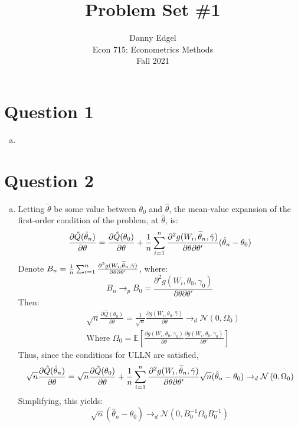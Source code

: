 \documentclass{article}
\newcommand{\N}{\mathcal{N}}
\newcommand{\est}[1]{\frac{1}{\lowercase{#1}}\sum_{i=1}^{\lowercase{#1}}}
\renewcommand{\tilde}[1]{\widetilde{#1}}
\newcommand{\that}{\hat{\theta}_n}
\newcommand{\ttilde}{\tilde{\theta}_n}
\newcommand{\ghat}{\hat{\gamma}}
\newcommand{\E}[1]{\mathbb{E}\left[#1\right]}%
\begin{document}
\title{	Problem Set \#1 }
\author{ 	Danny Edgel 					\\ 
			Econ 715: Econometrics Methods	\\
			Fall 2021						
		}
\maketitle\thispagestyle{empty}

\section*{Question 1}

\begin{enumerate}[(a)]
    \item 
\end{enumerate}

\section*{Question 2}

\begin{enumerate}[(a)]
    \item Letting $\tilde{\theta}$ be some value between $\theta_0$ and $\hat{\theta}$, the mean-value expansion of the first-order condition of the problem, at $\hat{\theta}$, is:\[
        \frac{\partial\hat{Q}(\that)}{\partial\theta} = \frac{\partial \hat{Q}(\theta_0)}{\partial\theta} + \est{n}\frac{\partial^2g(W_i,\ttilde,\ghat)}{\partial\theta\partial\theta'}(\that - \theta_0)
    \]
    Denote ${B_n = \est{n}\frac{\partial^2g(W_i,\ttilde,\ghat)}{\partial\theta\partial\theta'}}$, where: \[
        B_n\rightarrow_p B_0 = \frac{\partial^2g(W_i,\theta_0,\gamma_0)}{\partial\theta\partial\theta'}
    \]
    Then: \begin{align*}
        &\sqrt{n}\frac{\partial \hat{Q}(\theta_0)}{\partial\theta}  = \frac{1}{\sqrt{n}}\frac{\partial g(W_i, \theta_0, \ghat)}{\partial\theta}\rightarrow_d \N\left(0, \Omega_0\right) \\ &\text{Where }\Omega_0 = \E{\frac{\partial g(W_i,\theta_0,\gamma_0)}{\partial\theta}\frac{\partial g(W_i,\theta_0,\gamma_0)}{\partial\theta'}}
    \end{align*}
    Thus, since the conditions for ULLN are satisfied, {\small \[
        \sqrt{n}\frac{\partial\hat{Q}(\that)}{\partial\theta} = \sqrt{n}\frac{\partial \hat{Q}(\theta_0)}{\partial\theta} + \est{n}\frac{\partial^2g(W_i,\ttilde,\ghat)}{\partial\theta\partial\theta'}\sqrt{n}(\that - \theta_0)
        \rightarrow_d \N\left(0,\Omega_0\right)
    \] }
    Simplifying, this yields: \[
        \sqrt{n}(\that - \theta_0) \rightarrow_d \N\left(0, B_0^{-1}\Omega_0B_0^{-1}\right)
    \]
\end{enumerate}

\end{document}
